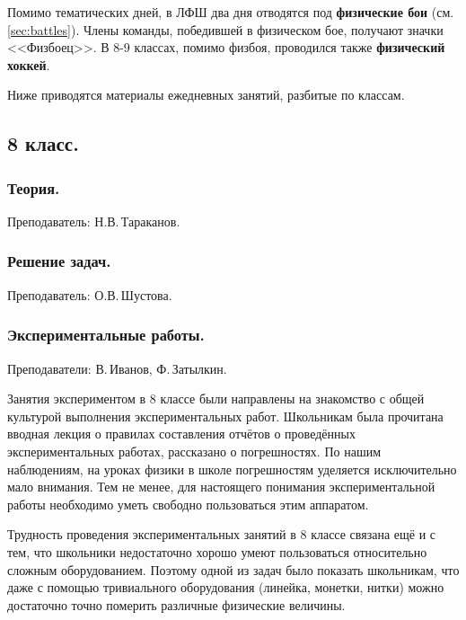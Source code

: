\documentclass[12pt,a4paper,oneside,draft]{scrartcl}
\begin{document}
Помимо тематических дней, в ЛФШ два дня отводятся под
\textbf{физические бои} (см. \ref{sec:battles}). Члены команды,
победившей в физическом бое, получают значки <<Физбоец>>. В 8-9
классах, помимо физбоя, проводился также \textbf{физический хоккей}.

Ниже приводятся материалы ежедневных занятий, разбитые по классам. 

\subsection{8 класс.}
\label{sec:daily_8}

\subsubsection{Теория.}
\label{sec:daily_8_th}

\textsf{Преподаватель: Н.В.\,Тараканов.}

\subsubsection{Решение задач.}
\label{sec:daily_8_problems}

\textsf{Преподаватель: О.В.\,Шустова.}

\subsubsection{Экспериментальные работы.}
\label{sec:daily_8_exp}

\textsf{Преподаватели: В.\,Иванов, Ф.\,Затылкин.}

Занятия экспериментом в 8 классе были направлены на знакомство с общей
культурой выполнения экспериментальных работ. Школьникам была
прочитана вводная лекция о правилах составления отчётов о проведённых
экспериментальных работах, рассказано о погрешностях. По нашим
наблюдениям, на уроках физики в школе погрешностям уделяется
исключительно мало внимания. Тем не менее, для настоящего понимания
экспериментальной работы необходимо уметь свободно пользоваться этим
аппаратом.

Трудность проведения экспериментальных занятий в 8 классе связана ещё
и с тем, что школьники недостаточно хорошо умеют пользоваться
относительно сложным оборудованием. Поэтому одной из задач было
показать школьникам, что даже с помощью тривиального оборудования
(линейка, монетки, нитки) можно достаточно точно померить различные
физические величины. 
\end{document}
